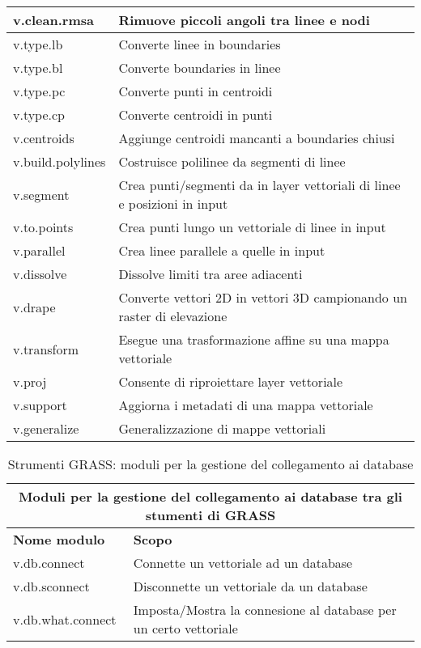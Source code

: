 \begin{table}[ht]
\begin{tabular}{|p{4cm}|p{12cm}|}
  \hline v.clean.rmsa & Rimuove piccoli angoli tra linee e nodi \\
  \hline v.type.lb & Converte linee in boundaries \\
  \hline v.type.bl & Converte boundaries in linee \\
  \hline v.type.pc & Converte punti in centroidi \\
  \hline v.type.cp & Converte centroidi in punti \\
  \hline v.centroids & Aggiunge centroidi mancanti a boundaries chiusi \\
  \hline v.build.polylines & Costruisce polilinee da segmenti di linee \\
  \hline v.segment & Crea punti/segmenti da in layer vettoriali di linee e posizioni in input \\
  \hline v.to.points & Crea punti lungo un vettoriale di linee in input \\
  \hline v.parallel & Crea linee parallele a quelle in input \\
  \hline v.dissolve & Dissolve limiti tra aree adiacenti \\
  \hline v.drape & Converte vettori 2D in vettori 3D campionando un raster di elevazione \\
  \hline v.transform & Esegue una trasformazione affine su una mappa vettoriale \\
  \hline v.proj & Consente di riproiettare layer vettoriale \\
  \hline v.support & Aggiorna i metadati di una mappa vettoriale \\
  \hline v.generalize & Generalizzazione di mappe vettoriali \\
\hline
\end{tabular}
\end{table}

\begin{table}[ht]
\centering
\caption{Strumenti GRASS: moduli per la gestione del collegamento ai database}\medskip
 \begin{tabular}{|p{4cm}|p{12cm}|}
  \hline \multicolumn{2}{|c|}{\textbf{Moduli per la gestione del collegamento ai database tra gli stumenti di GRASS}} \\
  \hline \textbf{Nome modulo} & \textbf{Scopo} \\
  \hline v.db.connect & Connette un vettoriale ad un database \\
  \hline v.db.sconnect & Disconnette un vettoriale da un database \\
  \hline v.db.what.connect & Imposta/Mostra la connesione al database per un certo vettoriale \\
\hline
\end{tabular}
\end{table}

